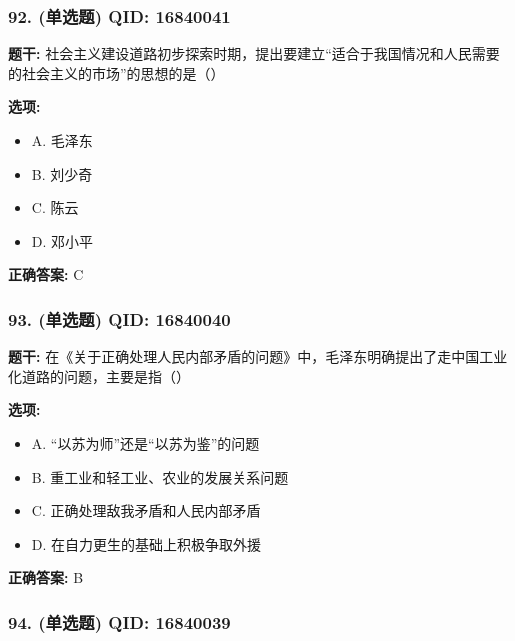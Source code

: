 \documentclass[12pt,UTF8]{ctexart}
\begin{document}
\subsubsection*{92. (单选题) \small QID: 16840041}

\textbf{题干:}
社会主义建设道路初步探索时期，提出要建立“适合于我国情况和人民需要的社会主义的市场”的思想的是（）

\textbf{选项:}
\begin{itemize}[leftmargin=*]

  \item A. 毛泽东

  \item B. 刘少奇

  \item C. 陈云

  \item D. 邓小平

\end{itemize}

\textbf{正确答案:}
C

\vspace{0.3em}\hrulefill\vspace{0.7em}

\subsubsection*{93. (单选题) \small QID: 16840040}

\textbf{题干:}
在《关于正确处理人民内部矛盾的问题》中，毛泽东明确提出了走中国工业化道路的问题，主要是指（）

\textbf{选项:}
\begin{itemize}[leftmargin=*]

  \item A. “以苏为师”还是“以苏为鉴”的问题

  \item B. 重工业和轻工业、农业的发展关系问题

  \item C. 正确处理敌我矛盾和人民内部矛盾

  \item D. 在自力更生的基础上积极争取外援

\end{itemize}

\textbf{正确答案:}
B

\vspace{0.3em}\hrulefill\vspace{0.7em}

\subsubsection*{94. (单选题) \small QID: 16840039}
\end{document}
